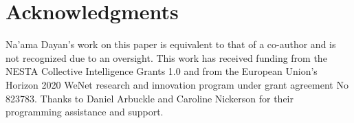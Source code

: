 \documentclass[letterpaper]{article} %
\begin{document}
\section*{Acknowledgments}
Na'ama Dayan's work on this paper is equivalent to that of a co-author and is not recognized due to an oversight.
This work has received funding from the NESTA Collective Intelligence Grants 1.0 and from the European Union's Horizon 2020 WeNet research and innovation program under grant agreement No 823783. Thanks to Daniel Arbuckle  and Caroline Nickerson for their programming assistance and support.







\end{document}
